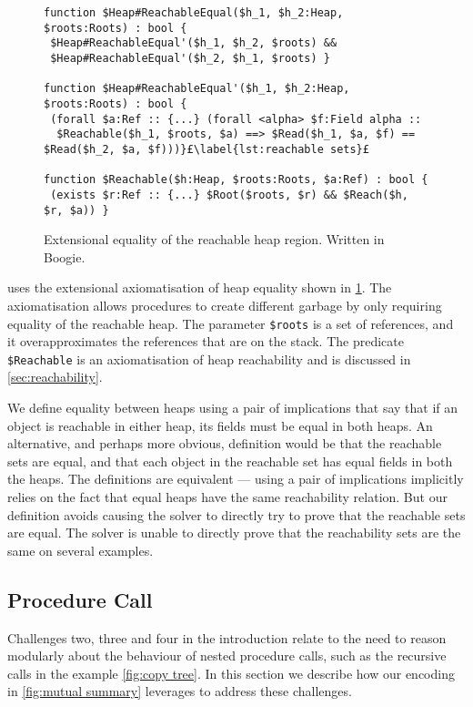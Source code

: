 \documentclass[runningheads,a4paper]{llncs}
\begin{document}
\begin{figure}[tbp]
\begin{lstlisting}[style=Boogie,firstnumber=auto,name=copyex]
function $Heap#ReachableEqual($h_1, $h_2:Heap, $roots:Roots) : bool {
 $Heap#ReachableEqual'($h_1, $h_2, $roots) &&
 $Heap#ReachableEqual'($h_2, $h_1, $roots) }

function $Heap#ReachableEqual'($h_1, $h_2:Heap, $roots:Roots) : bool {
 (forall $a:Ref :: {...} (forall <alpha> $f:Field alpha ::
  $Reachable($h_1, $roots, $a) ==> $Read($h_1, $a, $f) == $Read($h_2, $a, $f)))}£\label{lst:reachable sets}£

function $Reachable($h:Heap, $roots:Roots, $a:Ref) : bool {
 (exists $r:Ref :: {...} $Root($roots, $r) && $Reach($h, $r, $a)) }
\end{lstlisting}
\caption{Extensional equality of the reachable heap region. Written in Boogie.}\label{fig:extensionality}
\end{figure}

\Tool{} uses the extensional axiomatisation of heap equality shown in \cref{fig:extensionality}. The axiomatisation allows procedures to create different garbage by only requiring equality of the reachable heap. The parameter \texttt{\$roots} is a set of references, and it overapproximates the references that are on the stack. The predicate \texttt{\$Reachable} is an axiomatisation of heap reachability and is discussed in \cref{sec:reachability}.

We define equality between heaps using a pair of implications that say that if an object is reachable in either heap, its fields must be equal in both heaps. An alternative, and perhaps more obvious, definition would be that the reachable sets are equal, and that each object in the reachable set has equal fields in both the heaps. The definitions are equivalent --- using a pair of implications implicitly relies on the fact that equal heaps have the same reachability relation. But our definition avoids causing the solver to directly try to prove that the reachable sets are equal. The solver is unable to directly prove that the reachability sets are the same on several examples.

\subsection{Procedure Call}\label{sec:recursion}

Challenges two, three and four in the introduction relate to the need to reason modularly about the behaviour of nested procedure calls, such as the recursive calls in the example \cref{fig:copy tree}. In this section we describe how our encoding in \cref{fig:mutual summary} leverages \metho{} to address these challenges.
\end{document}
